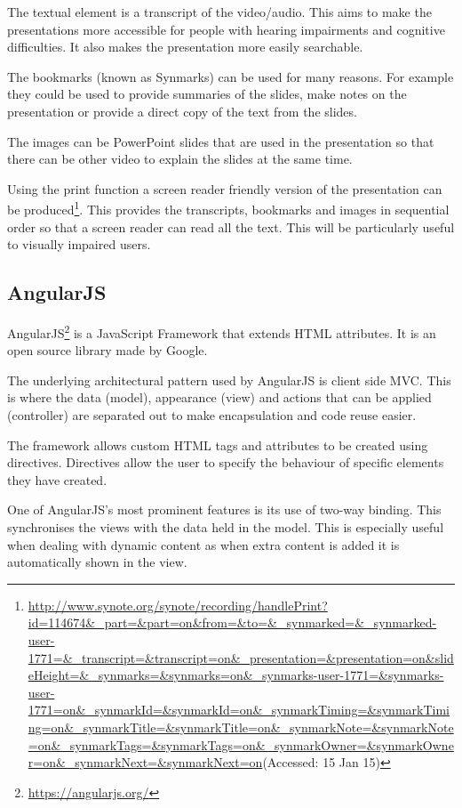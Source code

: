 The textual element is a transcript of the video/audio. This aims to make the presentations more accessible for people with hearing impairments and cognitive difficulties. It also makes the presentation more easily searchable.

The bookmarks (known as Synmarks) can be used for many reasons. For example they could be used to provide summaries of the slides, make notes on the presentation or provide a direct copy of the text from the slides.

The images can be PowerPoint slides that are used in the presentation so that there can be other video to explain the slides at the same time.

Using the print function a screen reader friendly version of the presentation can be produced\footnote{\url{http://www.synote.org/synote/recording/handlePrint?id=114674&_part=&part=on&from=&to=&_synmarked=&_synmarked-user-1771=&_transcript=&transcript=on&_presentation=&presentation=on&slideHeight=&_synmarks=&synmarks=on&_synmarks-user-1771=&synmarks-user-1771=on&_synmarkId=&synmarkId=on&_synmarkTiming=&synmarkTiming=on&_synmarkTitle=&synmarkTitle=on&_synmarkNote=&synmarkNote=on&_synmarkTags=&synmarkTags=on&_synmarkOwner=&synmarkOwner=on&_synmarkNext=&synmarkNext=on}(Accessed: 15 Jan 15)}. This provides the transcripts, bookmarks and images in sequential order so that a screen reader can read all the text. This will be particularly useful to visually impaired users.
\subsection{AngularJS}
\label{Section:AngularJS}
\gls{AngularJS}\footnote{\url{https://angularjs.org/}} is a JavaScript Framework that extends HTML attributes. It is an open source library made by Google.

The underlying architectural pattern used by \gls{AngularJS} is client side \gls{MVC}. This is where the data (model), appearance (view) and actions that can be applied (controller) are separated out to make encapsulation and code reuse easier. 

The framework allows custom HTML tags and attributes to be created using directives. Directives allow the user to specify the behaviour of specific elements they have created.

One of \gls{AngularJS}'s most prominent features is its use of two-way binding. This synchronises the views with the data held in the model. This is especially useful when dealing with dynamic content as when extra content is added it is automatically shown in the view.

